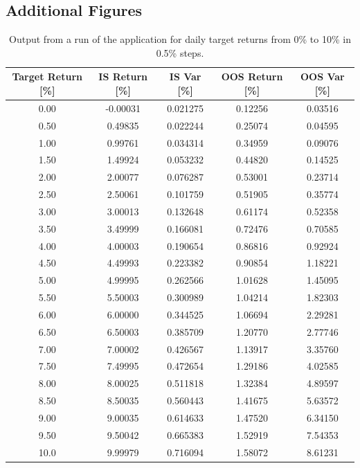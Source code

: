 \documentclass{article}
\begin{document}
\subsection{Additional Figures} 
\label{sec:add_figs}

\begin{center}
	\begin{table}[H]
\begin{tabular}{|c c c c c|} 
			\hline
			Target Return [\%] & IS Return  [\%]&	 IS Var [\%]  & OOS Return [\%]  & OOS Var [\%]  \\ [0.5ex] \hline \hline
			0.00  	 &	-0.00031  &	0.021275  	 &	0.12256  &	0.03516	\\ \hline
			0.50	 &	0.49835	  &	0.022244	 &	0.25074  &	0.04595	\\ \hline
			1.00	 &	0.99761   &	0.034314  	 &	0.34959  &	0.09076	\\ \hline
			1.50	 &	1.49924	  &	0.053232  	 &	0.44820  &	0.14525	\\ \hline
			2.00	 &	2.00077	  &	0.076287  	 &	0.53001  &	0.23714	\\ \hline
			2.50	 &	2.50061	  &	0.101759	 &	0.51905  &	0.35774		\\ \hline
			3.00	 &	3.00013	  &	0.132648	 &	0.61174  &	0.52358		\\ \hline
			3.50	 &	3.49999	  &	0.166081	 &	0.72476  &	0.70585		\\ \hline
			4.00	 &	4.00003	  &	0.190654	 &	0.86816  &	0.92924		\\ \hline
			4.50	 &	4.49993	  &	0.223382	 &	0.90854  &	1.18221		\\ \hline
			5.00	 &	4.99995	  &	0.262566	 &	1.01628	 &	1.45095		\\ \hline
			5.50	 &	5.50003	  &	0.300989	 &	1.04214	 &	1.82303		\\ \hline
			6.00	 &	6.00000	  &	0.344525	 &	1.06694	 &	2.29281		\\ \hline
			6.50	 &	6.50003	  &	0.385709	 &	1.20770	 &	2.77746		\\ \hline
			7.00	 &	7.00002	  &	0.426567	 &	1.13917	 &	3.35760		\\ \hline
			7.50	 &	7.49995	  &	0.472654	 &	1.29186	 &	4.02585		\\ \hline
			8.00	 &	8.00025	  &	0.511818	 &	1.32384	 &	4.89597		\\ \hline
			8.50 	 &	8.50035	  &	0.560443	 &	1.41675	 &	5.63572		\\ \hline
			9.00	 &	9.00035	  &	0.614633	 &	1.47520	 &	6.34150		\\ \hline
			9.50	 &	9.50042	  &	0.665383	 &	1.52919	 &	7.54353		\\ \hline
			10.0 	 &	9.99979	  &	0.716094	 &	1.58072	 &	8.61231 \\ [1ex]  \hline


\end{tabular}
\caption{Output from a run of the application for daily target returns from 0\% to 10\% in 0.5\% steps.}
\label{table:port_results}
	\end{table}
\end{center}
\end{document}
